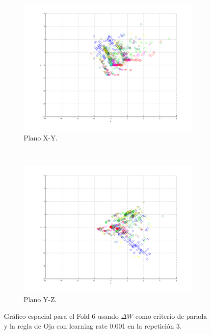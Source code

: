 \documentclass[informe.tex]{subfiles}
\begin{document}
\begin{figure}[H]
        \hspace*{-6.5cm}
        \begin{subfigure}[b]{0.49\textwidth}
                \includegraphics[width=\textwidth]{graficos/fold6_criterioParadap_reglaM_alpha0_rep3_2XY.png}
                \caption{Plano X-Y.}
        \end{subfigure}
        ~
        \begin{subfigure}[b]{0.49\textwidth}
                \includegraphics[width=\textwidth]{graficos/fold6_criterioParadap_reglaM_alpha0_rep3_3YZ.png}
                \caption{Plano Y-Z.}
        \end{subfigure}
	\restoregeometry
        \caption{Gráfico espacial para el Fold 6 usando $\Delta W$ como criterio de parada y la regla de Oja con learning rate 0.001 en la repetición 3.}
        \label{fig:fold6_criterioParadap_reglaM_alpha0_rep3}
	\end{figure}
      
\end{document}

